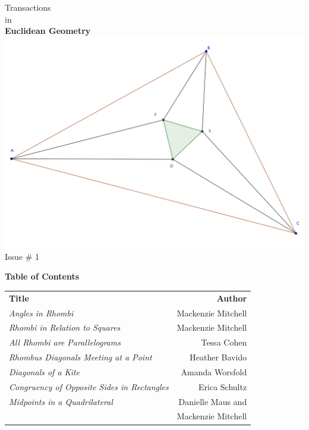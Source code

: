 \documentclass{report}
\begin{document}
\thispagestyle{empty}
\begin{center}
{\Huge Transactions\\ in\\ \textbf{Euclidean Geometry}}
\vspace{1in}
\includegraphics[width=1.1\textwidth]{cover-image.png}
\vfill
{\Huge Issue \# 1}
\end{center}

\clearpage

\center \Large \textbf{Table of Contents}\\[.5in]
\begin{tabular}{lr}
\textbf{Title} & \textbf{Author}\\[.25in]
\emph{Angles in Rhombi} & Mackenzie Mitchell \\[.5in]
\emph{Rhombi in Relation to Squares} & Mackenzie Mitchell \\[.5in]
\emph{All Rhombi are Parallelograms} & Tessa Cohen \\[.5in]
\emph{Rhombus Diagonals Meeting at a Point} & Heather Bavido \\[.5in]
\emph{Diagonals of a Kite} & Amanda Worsfold \\[.5in]
\emph{Congruency of Opposite Sides in Rectangles} & Erica Schultz \\[.5in]
\emph{Midpoints in a Quadrilateral} & Danielle Maus and \\
                         & Mackenzie Mitchell  
\end{tabular}








\end{document}
